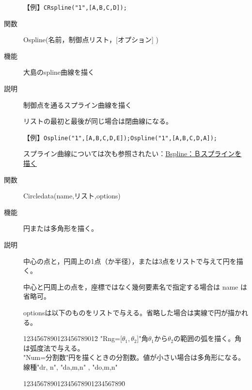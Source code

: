 \documentclass[papersize,a4paper,12pt,uplatex]{jsarticle}
\begin{document}
\begin{description}
\vspace{\baselineskip}
【例】\verb|CRspline("1",[A,B,C,D]);|

\hspace{20mm} 


\vspace{\baselineskip}
\hypertarget{ospline}{}
\item[関数]Ospline(名前，制御点リスト，[オプション] )
\item[機能]大島のspline曲線を描く
\item[説明]制御点を通るスプライン曲線を描く

リストの最初と最後が同じ場合は閉曲線になる。

\vspace{\baselineskip}
【例】\verb|Ospline("1",[A,B,C,D,E]);|\verb|Ospline("1",[A,B,C,D,A]);|

 

\vspace{\baselineskip}
 スプライン曲線については次も参照されたい：\hyperlink{bspline}{Bspline：Ｂスプラインを描く} 


\vspace{\baselineskip}
\hypertarget{circledata}{}
\item[関数]Circledata(name,リスト,options)
\item[機能]円または多角形を描く。
\item[説明]中心の点と，円周上の1点（か半径），または3点をリストで与えて円を描く。

中心と円周上の点を，座標ではなく幾何要素名で指定する場合は name は省略可。

optionsは以下のものをリストで与える。省略した場合は実線で円が描かれる。
\begin{tabbing}
1234\=567890123456789012\=\kill
 \>"Rng=[$\theta_1,\theta_2$]"\>角$\theta_1$から$\theta_2$の範囲の弧を描く。角は弧度法で与える。\\
 \>"Num=分割数"\>円を描くときの分割数。値が小さい場合は多角形になる。\\
 \>線種\>"dr, n", "da,m,n" , "do,m,n"
\end{tabbing}
\begin{tabbing}
1234\=56789012345678901234567890\=\kill


\end{tabbing}
\end{description}
\end{document}
